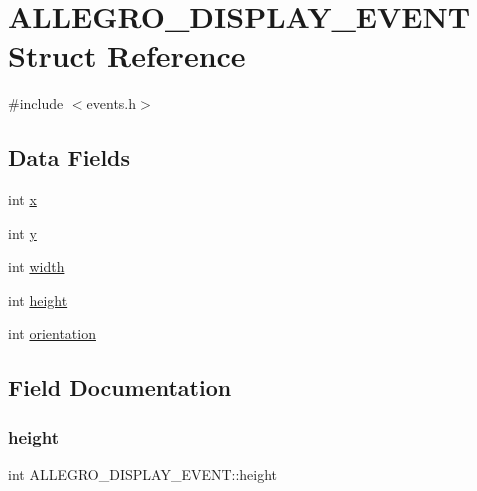 \hypertarget{struct_a_l_l_e_g_r_o___d_i_s_p_l_a_y___e_v_e_n_t}{}\section{A\+L\+L\+E\+G\+R\+O\+\_\+\+D\+I\+S\+P\+L\+A\+Y\+\_\+\+E\+V\+E\+NT Struct Reference}
\label{struct_a_l_l_e_g_r_o___d_i_s_p_l_a_y___e_v_e_n_t}


{\ttfamily \#include $<$events.\+h$>$}

\subsection*{Data Fields}
\begin{DoxyCompactItemize}
\item 
int \hyperlink{struct_a_l_l_e_g_r_o___d_i_s_p_l_a_y___e_v_e_n_t_a57062be4573ee70dd4ee34ddd0adc100}{x}
\item 
int \hyperlink{struct_a_l_l_e_g_r_o___d_i_s_p_l_a_y___e_v_e_n_t_aa197b407ce1723b9387df919d63cc1d7}{y}
\item 
int \hyperlink{struct_a_l_l_e_g_r_o___d_i_s_p_l_a_y___e_v_e_n_t_ab57a09c3986063f214a46c30afd67675}{width}
\item 
int \hyperlink{struct_a_l_l_e_g_r_o___d_i_s_p_l_a_y___e_v_e_n_t_a269fc62c7907d5da2f8ee9126825cd4a}{height}
\item 
int \hyperlink{struct_a_l_l_e_g_r_o___d_i_s_p_l_a_y___e_v_e_n_t_a2944c937a1cb22d395e5d70d8ddb1936}{orientation}
\end{DoxyCompactItemize}


\subsection{Field Documentation}
\mbox{\label{struct_a_l_l_e_g_r_o___d_i_s_p_l_a_y___e_v_e_n_t_a269fc62c7907d5da2f8ee9126825cd4a}} 
\subsubsection{\texorpdfstring{height}{height}}
{\footnotesize\ttfamily int A\+L\+L\+E\+G\+R\+O\+\_\+\+D\+I\+S\+P\+L\+A\+Y\+\_\+\+E\+V\+E\+N\+T\+::height}

